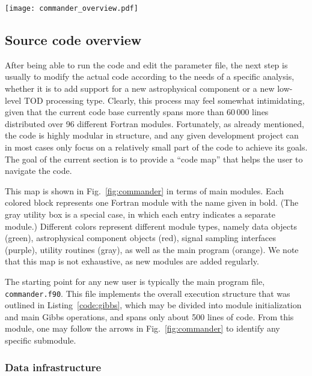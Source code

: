 \documentclass[twocolumn]{aa}
\def\commander{\texttt{Commander}}
\begin{document}
\begin{figure*}[t]
  \center
  \texttt{[image: commander\_overview.pdf]}
  \caption{Overview of the \commander\ source code. The main program
    is called \texttt{commander.f90}, and is indicated by the orange
    box in the center. All other boxes represents individual modules,
    except the gray box to the right, which summarizes various utility modules.
  }\label{fig:commander}
\end{figure*}

\subsection{Source code overview}

After being able to run the code and edit the parameter file, the next
step is usually to modify the actual code according to the needs of a
specific analysis, whether it is to add support for a new
astrophysical component or a new low-level TOD processing
type. Clearly, this process may feel somewhat intimidating, given that
the current code base currently spans more than 60\,000 lines
distributed over 96 different Fortran modules. Fortunately, as already
mentioned, the code is highly modular in structure, and any given
development project can in most cases only focus on a relatively small
part of the code to achieve its goals. The goal of the current section
is to provide a ``code map'' that helps the user to navigate the code.

This map is shown in Fig.~\ref{fig:commander} in terms of main
modules. Each colored block represents one Fortran module with the
name given in bold. (The gray utility box is a special case, in which
each entry indicates a separate module.) Different colors represent
different module types, namely data objects (green), astrophysical
component objects (red), signal sampling interfaces (purple), utility
routines (gray), as well as the main program (orange). We note that
this map is not exhaustive, as new modules are added regularly.

The starting point for any new user is typically the main program
file, \texttt{commander.f90}. This file implements the overall
execution structure that was outlined in Listing~\ref{code:gibbs}, which
may be divided into module initialization and main Gibbs operations,
and spans only about 500 lines of code. From this module, one may
follow the arrows in Fig.~\ref{fig:commander} to identify any specific
submodule.

\subsubsection{Data infrastructure}
\end{document}
